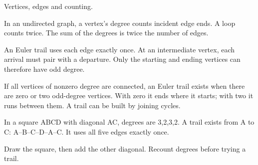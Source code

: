 \documentclass[11pt]{article}
\begin{document}
Vertices, edges and counting.\par
{}
In an undirected graph, a vertex’s degree counts incident edge ends. A loop counts twice. The sum of the degrees is twice the number of edges.\par
An Euler trail uses each edge exactly once. At an intermediate vertex, each arrival must pair with a departure. Only the starting and ending vertices can therefore have odd degree.\par
If all vertices of nonzero degree are connected, an Euler trail exists when there are zero or two odd-degree vertices. With zero it ends where it starts; with two it runs between them. A trail can be built by joining cycles.\par
{}
In a square ABCD with diagonal AC, degrees are 3,2,3,2. A trail exists from A to C: A--B--C--D--A--C. It uses all five edges exactly once.\par
\begin{center}\end{center}
Draw the square, then add the other diagonal. Recount degrees before trying a trail.\par
\end{document}
